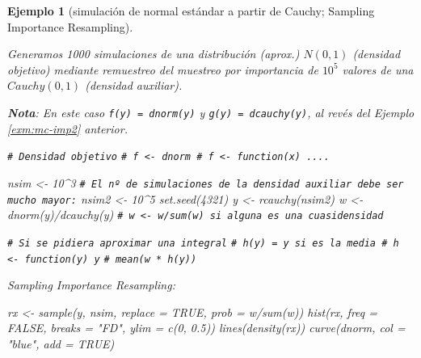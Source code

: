 \documentclass[
]{book}
\newenvironment{Shaded}{\begin{snugshade}}{\end{snugshade}}
\newcommand{\AttributeTok}[1]{\textcolor[rgb]{0.77,0.63,0.00}{#1}}
\newcommand{\CommentTok}[1]{\textcolor[rgb]{0.56,0.35,0.01}{\textit{#1}}}
\newcommand{\ConstantTok}[1]{\textcolor[rgb]{0.00,0.00,0.00}{#1}}
\newcommand{\DecValTok}[1]{\textcolor[rgb]{0.00,0.00,0.81}{#1}}
\newcommand{\FloatTok}[1]{\textcolor[rgb]{0.00,0.00,0.81}{#1}}
\newcommand{\FunctionTok}[1]{\textcolor[rgb]{0.00,0.00,0.00}{#1}}
\newcommand{\NormalTok}[1]{#1}
\newcommand{\OtherTok}[1]{\textcolor[rgb]{0.56,0.35,0.01}{#1}}
\newcommand{\SpecialCharTok}[1]{\textcolor[rgb]{0.00,0.00,0.00}{#1}}
\newcommand{\StringTok}[1]{\textcolor[rgb]{0.31,0.60,0.02}{#1}}
\theoremstyle{break}
\newtheorem{example}{Ejemplo}[chapter]
\theoremstyle{nonumberplain}
\renewcommand{\CommentTok}[1]{\textcolor[rgb]{0.41,0.41,0.41}{\texttt{#1}}}
\begin{document}
\begin{example}[simulación de normal estándar a partir de Cauchy; Sampling Importance Resampling]
\protect\hypertarget{exm:mc-imp-sample}{}\label{exm:mc-imp-sample}

Generamos 1000 simulaciones de una distribución (aprox.) \(N(0,1)\) (densidad objetivo) mediante remuestreo del muestreo por importancia de \(10^{5}\) valores de una \(Cauchy(0,1)\) (densidad auxiliar).

\textbf{Nota}: En este caso \texttt{f(y)\ =\ dnorm(y)} y \texttt{g(y)\ =\ dcauchy(y)}, al revés del Ejemplo \ref{exm:mc-imp2} anterior.

\begin{Shaded}
\begin{Highlighting}[]
\CommentTok{\# Densidad objetivo}
\CommentTok{\# f \textless{}{-} dnorm \# f \textless{}{-} function(x) ....}

\NormalTok{nsim }\OtherTok{\textless{}{-}} \DecValTok{10}\SpecialCharTok{\^{}}\DecValTok{3}
\CommentTok{\# El nº de simulaciones de la densidad auxiliar debe ser mucho mayor:}
\NormalTok{nsim2 }\OtherTok{\textless{}{-}} \DecValTok{10}\SpecialCharTok{\^{}}\DecValTok{5}
\FunctionTok{set.seed}\NormalTok{(}\DecValTok{4321}\NormalTok{)}
\NormalTok{y }\OtherTok{\textless{}{-}} \FunctionTok{rcauchy}\NormalTok{(nsim2)}
\NormalTok{w }\OtherTok{\textless{}{-}} \FunctionTok{dnorm}\NormalTok{(y)}\SpecialCharTok{/}\FunctionTok{dcauchy}\NormalTok{(y) }\CommentTok{\# w \textless{}{-} w/sum(w) si alguna es una cuasidensidad}

\CommentTok{\# Si se pidiera aproximar una integral}
\CommentTok{\# h(y) = y si es la media \# h \textless{}{-} function(y) y}
\CommentTok{\# mean(w * h(y))}
\end{Highlighting}
\end{Shaded}

Sampling Importance Resampling:

\begin{Shaded}
\begin{Highlighting}[]
\NormalTok{rx }\OtherTok{\textless{}{-}} \FunctionTok{sample}\NormalTok{(y, nsim, }\AttributeTok{replace =} \ConstantTok{TRUE}\NormalTok{, }\AttributeTok{prob =}\NormalTok{ w}\SpecialCharTok{/}\FunctionTok{sum}\NormalTok{(w))}
\FunctionTok{hist}\NormalTok{(rx, }\AttributeTok{freq =} \ConstantTok{FALSE}\NormalTok{, }\AttributeTok{breaks =} \StringTok{"FD"}\NormalTok{, }\AttributeTok{ylim =} \FunctionTok{c}\NormalTok{(}\DecValTok{0}\NormalTok{, }\FloatTok{0.5}\NormalTok{))}
\FunctionTok{lines}\NormalTok{(}\FunctionTok{density}\NormalTok{(rx))}
\FunctionTok{curve}\NormalTok{(dnorm, }\AttributeTok{col =} \StringTok{"blue"}\NormalTok{, }\AttributeTok{add =} \ConstantTok{TRUE}\NormalTok{)}
\end{Highlighting}
\end{Shaded}


\end{example}
\end{document}
